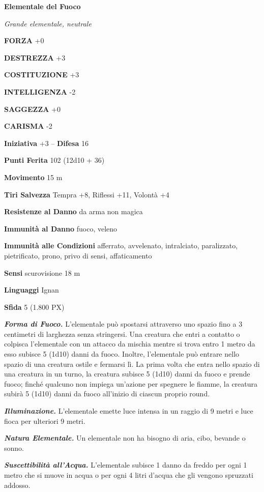 \begin{multicols}{2}
\medskip{}\textbf{Elementale del Fuoco}

\textit{Grande elementale, neutrale}

\textbf{FORZA} +0

\textbf{DESTREZZA} +3

\textbf{COSTITUZIONE} +3

\textbf{INTELLIGENZA} -2

\textbf{SAGGEZZA} +0

\textbf{CARISMA} -2

\textbf{Iniziativa} +3 -- \textbf{Difesa} 16

\textbf{Punti Ferita} 102 (12d10 + 36)

\textbf{Movimento} 15 m

\textbf{Tiri Salvezza} Tempra +8, Riflessi +11, Volontà +4

\textbf{Resistenze al Danno} da arma non magica

\textbf{Immunità al Danno} fuoco, veleno

\textbf{Immunità alle Condizioni} afferrato, avvelenato, intralciato, paralizzato, pietrificato, prono, privo di sensi, affaticamento

\textbf{Sensi} scurovisione 18 m

\textbf{Linguaggi} Ignan

\textbf{Sfida} 5 (1.800 PX)

\textit{\textbf{Forma di Fuoco.}} L'elementale può spostarsi attraverso uno spazio fino a 3 centimetri di larghezza senza stringersi. Una creatura che entri a contatto o colpisca l'elementale con un attacco da mischia mentre si trova entro 1 metro da esso subisce 5 (1d10) danni da fuoco. Inoltre, l'elementale può entrare nello spazio di una creatura ostile e fermarsi lì. La prima volta che entra nello spazio di una creatura in un turno, la creatura subisce 5 (1d10) danni da fuoco e prende fuoco; finché qualcuno non impiega un'azione per spegnere le fiamme, la creatura subirà 5 (1d10) danni da fuoco all'inizio di ciascun proprio round.

\textit{\textbf{Illuminazione.}} L'elementale emette luce intensa in un raggio di 9 metri e luce fioca per ulteriori 9 metri.

\textit{\textbf{Natura Elementale.}} Un elementale non ha bisogno di aria, cibo, bevande o sonno.

\textit{\textbf{Suscettibilità all'Acqua.}} L'elementale subisce 1 danno da freddo per ogni 1 metro che si muove in acqua o per ogni 4 litri d'acqua che gli vengono spruzzati addosso.


\end{multicols}
